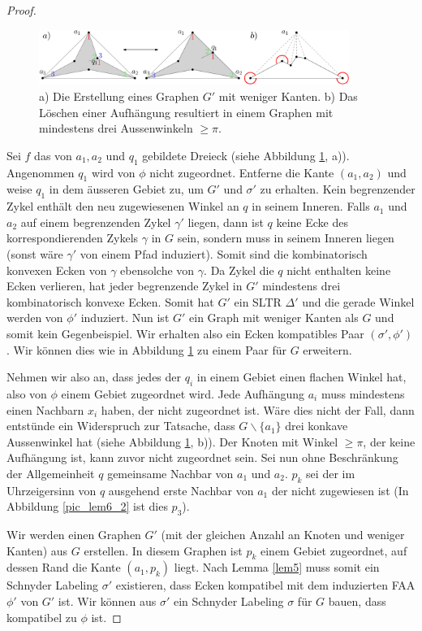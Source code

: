 \begin{proof}
\begin{figure}
	\centering
	  \includegraphics[width=0.9\textwidth]{lem6_1.png}
    	\caption{a) Die Erstellung eines Graphen $G'$ mit weniger Kanten. b) Das Löschen einer Aufhängung resultiert in einem Graphen mit mindestens drei Aussenwinkeln $\geq \pi$.}
    	\label{pic_lem6_1}
\end{figure}

Sei $f$ das von $a_1,a_2$ und $q_1$ gebildete Dreieck (siehe Abbildung \ref{pic_lem6_1}, a)). Angenommen $q_1$ wird von $\phi$ nicht zugeordnet. Entferne die Kante $(a_1,a_2)$ und weise $q_1$ in dem äusseren Gebiet zu, um $G'$ und $\sigma'$ zu erhalten. Kein begrenzender Zykel enthält den neu zugewiesenen Winkel an $q$ in seinem Inneren. Falls $a_1$ und $a_2$ auf einem begrenzenden Zykel $\gamma'$ liegen, dann ist $q$ keine Ecke des korrespondierenden Zykels $\gamma$ in $G$ sein, sondern muss in seinem Inneren liegen (sonst wäre $\gamma'$ von einem Pfad induziert). Somit sind die kombinatorisch konvexen Ecken von $\gamma$ ebensolche von $\gamma$. Da Zykel die $q$ nicht enthalten keine Ecken verlieren, hat jeder begrenzende Zykel in $G'$ mindestens drei kombinatorisch konvexe Ecken. Somit hat $G'$ ein SLTR $\Delta'$ und die gerade Winkel werden von $\phi'$ induziert. Nun ist $G'$ ein Graph mit weniger Kanten als $G$ und somit kein Gegenbeispiel. Wir erhalten also ein Ecken kompatibles Paar $(\sigma',\phi')$. Wir können dies wie in Abbildung \ref{pic_lem6_1} zu einem Paar für $G$ erweitern.

Nehmen wir also an, dass jedes der $q_i$ in einem Gebiet einen flachen Winkel hat, also von $\phi$ einem Gebiet zugeordnet wird. Jede Aufhängung $a_i$ muss mindestens einen Nachbarn $x_i$ haben, der nicht zugeordnet ist. Wäre dies nicht der Fall, dann entstünde ein Widerspruch zur Tatsache, dass $G\backslash \{a_1\}$ drei konkave Aussenwinkel hat (siehe Abbildung \ref{pic_lem6_1}, b)). Der Knoten mit Winkel $\geq \pi$, der keine Aufhängung ist, kann zuvor nicht zugeordnet sein. Sei nun ohne Beschränkung der Allgemeinheit $q$ gemeinsame Nachbar von $a_1$ und $a_2$. $p_k$ sei der im Uhrzeigersinn von $q$ ausgehend erste Nachbar von $a_1$ der nicht zugewiesen ist (In Abbildung \ref{pic_lem6_2} ist dies $p_3$).

Wir werden einen Graphen $G'$ (mit der gleichen Anzahl an Knoten und weniger Kanten) aus $G$ erstellen. In diesem Graphen ist $p_k$ einem Gebiet zugeordnet, auf dessen Rand die Kante $(a_1,p_k)$ liegt. Nach Lemma \ref{lem5} muss somit ein Schnyder Labeling $\sigma'$ existieren, dass Ecken kompatibel mit dem induzierten FAA $\phi'$ von $G'$ ist. Wir können aus $\sigma'$ ein Schnyder Labeling $\sigma$ für $G$ bauen, dass kompatibel zu $\phi$ ist.


\end{proof}
